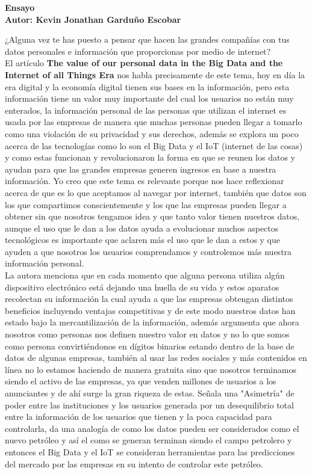 \documentclass[12pt]{report}
\begin{document}
\begin{enumerate}[label=\textbf{\arabic*.}, leftmargin=*]
\begin{enumerate}[label=\textbf{\alph*.}, leftmargin=*, itemsep=1.0em]
\newpage
\textbf{Ensayo\\
        Autor: Kevin Jonathan Garduño Escobar}

¿Alguna vez te has puesto a pensar que hacen las grandes compañías con tus datos personales e información que proporcionas por medio de internet?\\

El artículo \textbf{The value of our personal data in the Big Data and the Internet of all Things Era} nos habla precisamente de este tema, hoy en día la era digital y la economía digital tienen sus bases en la información, pero esta información tiene un valor muy importante del cual los usuarios no están muy enterados, la información personal de las personas que utilizan el internet es usada por las empresas de manera que muchas personas pueden llegar a tomarlo como una violación de su privacidad y sus derechos, además se explora un poco acerca de las tecnologías como lo son el Big Data y el IoT (internet de las cosas) y como estas funcionan y revolucionaron la forma en que se reunen los datos y ayudan para que las grandes empresas generen ingresos en base a nuestra información. Yo creo que este tema es relevante porque nos hace reflexionar acerca de que es lo que aceptamos al navegar por internet, también que datos son los que compartimos conscientemente y los que las empresas pueden llegar a obtener sin que nosotros tengamos idea y que tanto valor tienen nuestros datos, aunque el uso que le dan a los datos ayuda a evolucionar muchos aspectos tecnológicos es importante que aclaren más el uso que le dan a estos y que ayuden a que nosotros los usuarios comprendamos y controlemos más nuestra información personal.\\

La autora menciona que en cada momento que alguna persona utiliza algún dispositivo electrónico está dejando una huella de su vida y estos aparatos recolectan su información la cual ayuda a que las empresas obtengan distintos beneficios incluyendo ventajas competitivas y de este modo nuestros datos han estado bajo la mercantilización de la información, además argumenta que ahora nosotros como personas nos definen nuestro valor en datos y no lo que somos como persona convirtiéndonos en dígitos binarios estando dentro de la base de datos de algunas empresas, también al usar las redes sociales y más contenidos en línea no lo estamos haciendo de manera gratuita sino que nosotros terminamos siendo el activo de las empresas, ya que venden millones de usuarios a los anunciantes y de ahí surge la gran riqueza de estas. Señala una "Asimetría" de poder entre las instituciones y los usuarios generada por un desequilibrio total entre la información de los usuarios que tienen y la poca capacidad para controlarla, da una analogía de como los datos pueden ser considerados como el nuevo petróleo y así el como se generan terminan siendo el campo petrolero y entonces el Big Data y el IoT se consideran herramientas para las predicciones del mercado por las empresas en su intento de controlar este petróleo.\\


\end{enumerate}
\end{enumerate}
\end{document}
